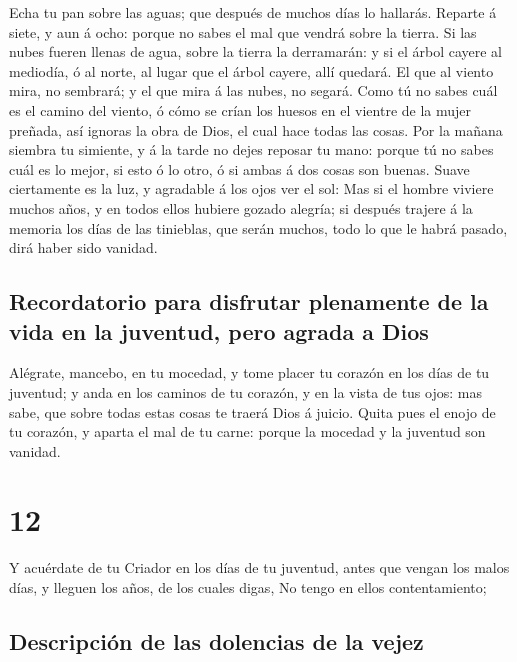 Echa tu pan sobre las aguas; que después de muchos días
lo hallarás.  Reparte á siete, y aun á ocho: porque no
sabes el mal que vendrá sobre la tierra.  Si las nubes
fueren llenas de agua, sobre la tierra la derramarán: y si el árbol
cayere al mediodía, ó al norte, al lugar que el árbol cayere, allí
quedará.  El que al viento mira, no sembrará; y el que
mira á las nubes, no segará.  Como tú no sabes cuál es el
camino del viento, ó cómo se crían los huesos en el vientre de la mujer
preñada, así ignoras la obra de Dios, el cual hace todas las cosas.
 Por la mañana siembra tu simiente, y á la tarde no dejes
reposar tu mano: porque tú no sabes cuál es lo mejor, si esto ó lo otro,
ó si ambas á dos cosas son buenas.  Suave ciertamente es
la luz, y agradable á los ojos ver el sol:  Mas si el
hombre viviere muchos años, y en todos ellos hubiere gozado alegría; si
después trajere á la memoria los días de las tinieblas, que serán
muchos, todo lo que le habrá pasado, dirá haber sido vanidad.

\hypertarget{recordatorio-para-disfrutar-plenamente-de-la-vida-en-la-juventud-pero-agrada-a-dios}{%
\subsection{Recordatorio para disfrutar plenamente de la vida en la
juventud, pero agrada a
Dios}\label{recordatorio-para-disfrutar-plenamente-de-la-vida-en-la-juventud-pero-agrada-a-dios}}

 Alégrate, mancebo, en tu mocedad, y tome placer tu
corazón en los días de tu juventud; y anda en los caminos de tu corazón,
y en la vista de tus ojos: mas sabe, que sobre todas estas cosas te
traerá Dios á juicio.  Quita pues el enojo de tu corazón,
y aparta el mal de tu carne: porque la mocedad y la juventud son
vanidad.

\hypertarget{section-21-12}{%
\section{12}\label{section-21-12}}

 Y acuérdate de tu Criador en los días de tu juventud,
antes que vengan los malos días, y lleguen los años, de los cuales
digas, No tengo en ellos contentamiento;

\hypertarget{descripciuxf3n-de-las-dolencias-de-la-vejez}{%
\subsection{Descripción de las dolencias de la
vejez}\label{descripciuxf3n-de-las-dolencias-de-la-vejez}}

